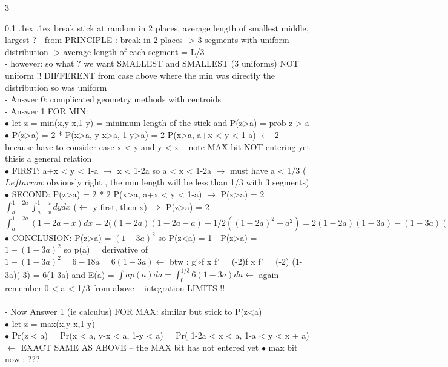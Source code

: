 \documentclass[10pt,landscape,a4paper]{article}
\makeatletter
\renewcommand{\section}{\@startsection{section}{1}{0mm}%
                                {.1ex}%
                                {.1ex}%
                                {\color{blue}\sffamily\small\bfseries}}
\makeatother
\begin{document}
\begin{multicols*}{3}
\begin{spacing}{0.1}
\section{break stick at random in 2 places, average length of smallest middle, largest  ? } 
- from PRINCIPLE : break in 2 places -> 3 segments with uniform distribution -> average length of each segment = L/3\\
- however: so what ? we want SMALLEST and SMALLEST (3 uniforms) NOT uniform !! DIFFERENT from case above where the min was directly the distribution so was uniform \\
- Answer 0: complicated geometry methods with centroids \\
- Answer 1 FOR MIN: \\
$\bullet$ let z = min(x,y-x,1-y) = minimum length of the stick and P(z>a) = prob z > a \\
$\bullet$ P(z>a) = 2 * P(x>a, y-x>a, 1-y>a) = 2 P(x>a, a+x < y < 1-a) $\longleftarrow$ 2 because have to consider case x < y and y < x -- note MAX bit NOT entering yet thisis a general relation \\
$\bullet$ FIRST: a+x < y < 1-a $\rightarrow$ x < 1-2a so a < x < 1-2a $\rightarrow$  must have a < 1/3 ($Leftarrow$ obviously right , the min length will be less than 1/3 with 3 segments)\\
$\bullet$ SECOND: P(z>a) =  2 * 2 P(x>a, a+x < y < 1-a) $\rightarrow$ P(z>a) = 2 $\int_{a}^{1-2a} \int_{a+x}^{1-a} dy dx$ ($\leftarrow$ y first, then x) $\Rightarrow$ P(z>a) = 2 $\int_{a}^{1-2a} (1-2a-x) dx = 2 ( (1-2a) (1-2a-a) - 1/2 ((1-2a)^2 - a^2) = 2 (1-2a) (1-3a) - (1-3a) (1-a) = (1-3a) (2(1-2a)-(1-a) = (1-3a) (1-3a) = (1-3a)^2$ \\
$\bullet$ CONCLUSION: P(z>a) = $(1-3a)^2$ so P(z<a) = 1 - P(z>a) = $1-(1-3a)^2$ so p(a) = derivative of $1-(1-3a)^2 = 6 -18a = 6 (1-3a) \leftarrow$ btw : g'$\circ$f x f' = (-2)f x f' = (-2) (1-3a)(-3) = 6(1-3a) and E(a) = $ \int a p(a) da = \int_{0}^{1/3} 6(1-3a) da \leftarrow$ again remember 0 < a < 1/3 from above -- integration LIMITS !! \\
\\
- Now Answer 1 (ie calculus) FOR MAX: similar but stick to P(z<a)\\
$\bullet$ let z = max(x,y-x,1-y) \\
$\bullet$  Pr(z < a) = Pr(x < a, y-x < a, 1-y < a) = Pr( 1-2a < x < a, 1-a < y < x + a) $\leftarrow$ EXACT SAME AS ABOVE -- the MAX bit has not entered yet
$\bullet$ max bit now : ???


\end{spacing}
\end{multicols*}
\end{document}
